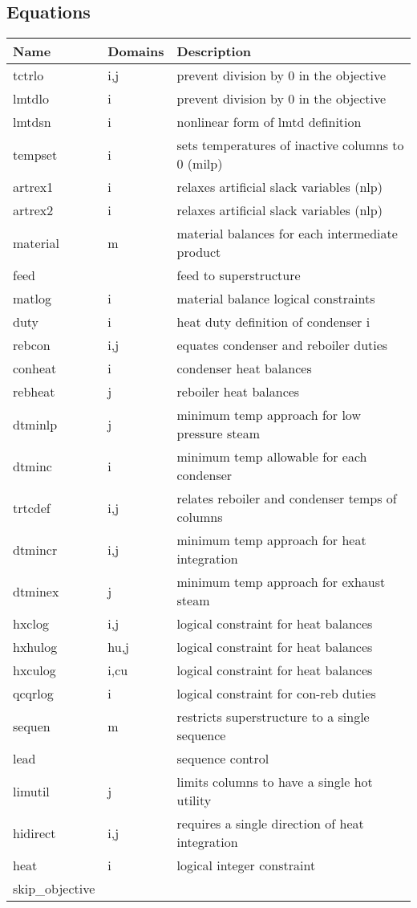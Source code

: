 \documentclass[11pt]{article}
\begin{document}
\subsection*{Equations}
\begin{tabularx}{\textwidth}{| l | l | X |}
\hline
\textbf{Name} & \textbf{Domains} & \textbf{Description}\\
\hline
\endhead

tctrlo & i,j & prevent division by 0 in the objective\\
lmtdlo & i & prevent division by 0 in the objective\\
lmtdsn & i & nonlinear form of lmtd definition\\
tempset & i & sets temperatures of inactive columns to 0 (milp)\\
artrex1 & i & relaxes artificial slack variables (nlp)\\
artrex2 & i & relaxes artificial slack variables (nlp)\\
material & m & material balances for each intermediate product\\
feed &  & feed to superstructure\\
matlog & i & material balance logical constraints\\
duty & i & heat duty definition of condenser i\\
rebcon & i,j & equates condenser and reboiler duties\\
conheat & i & condenser heat balances\\
rebheat & j & reboiler heat balances\\
dtminlp & j & minimum temp approach for low pressure steam\\
dtminc & i & minimum temp allowable for each condenser\\
trtcdef & i,j & relates reboiler and condenser temps of columns\\
dtmincr & i,j & minimum temp approach for heat integration\\
dtminex & j & minimum temp approach for exhaust steam\\
hxclog & i,j & logical constraint for heat balances\\
hxhulog & hu,j & logical constraint for heat balances\\
hxculog & i,cu & logical constraint for heat balances\\
qcqrlog & i & logical constraint for con-reb duties\\
sequen & m & restricts superstructure to a single sequence\\
lead &  & sequence control\\
limutil & j & limits columns to have a single hot utility\\
hidirect & i,j & requires a single direction of heat integration\\
heat & i & logical integer constraint\\
skip\_objective &  & \\
\hline
\end{tabularx}
\end{document}
